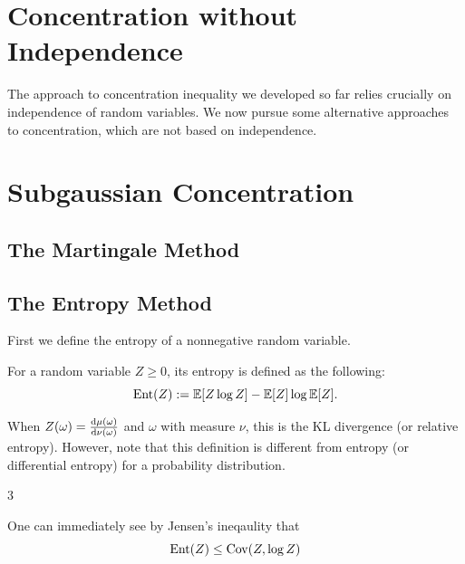 \section{Concentration without Independence}
The approach to concentration inequality we developed so far relies crucially on independence of random variables.
We now pursue some alternative approaches to concentration, which are not based on independence.


\section{Subgaussian Concentration}

\subsection{The Martingale Method}

\begin{lemma}[Azuma]
    
\end{lemma}



\subsection{The Entropy Method}

First we define the entropy of a nonnegative random variable. 
\begin{definition}
    For a random variable $Z\geq 0$, its entropy is defined as the following:
    \begin{equation*}
        \operatorname{Ent}(Z):=\mathbb{E} [Z\log Z]-\mathbb{E} [Z]\log \mathbb{E}[Z].
    \end{equation*}
\end{definition}
\begin{remark}
    When $Z(\omega)=\frac{\mathrm{d}{\mu}(\omega)}{\mathrm{d}{\nu}(\omega)}$ and $\omega$ with measure $\nu$, this is the KL divergence (or relative entropy).
    However, note that this definition is different from entropy (or differential entropy) for a probability distribution.
\end{remark}3

One can immediately see by Jensen's ineqaulity that 
\[\operatorname{Ent}(Z)\leq \operatorname{Cov}(Z,\log Z)\]

